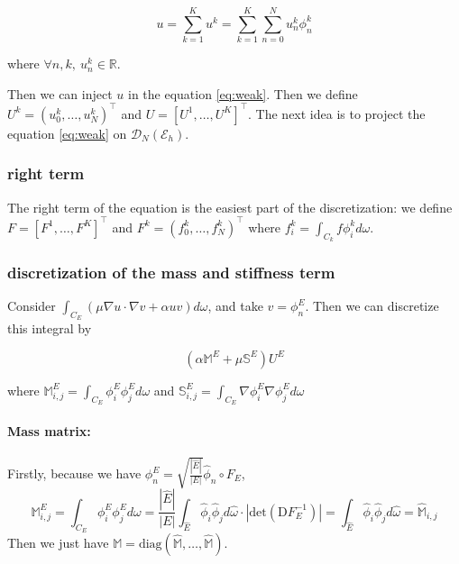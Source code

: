 \documentclass[a4paper,10pt]{article}
\begin{document}
$$
u = \sum_{k=1}^K u^k = \sum_{k=1}^K \sum_{n=0}^N u_n^k \phi_n^k
$$

where $\forall n,k,\ u_n^k \in \mathbb{R}$.


Then we can inject $u$ in the equation \ref{eq:weak}. Then we define $U^k = 
(u_0^k, \dots , u_N^k)^\top$ and $U = [U^1, \dots , U^K]^\top$. The next idea is to project the 
equation \ref{eq:weak} on $\mathcal{D}_N(\mathcal{E}_h)$.

\subsubsection{right term}

The right term of the equation is the easiest part of the discretization: we define $F = [F^1, 
\dots , F^K]^\top$ and $F^k = 
(f_0^k, \dots , f_N^k)^\top$ where $f_i^k = \int_{C_k} f \phi_i^k d\omega$.



\subsubsection{discretization of the mass and stiffness term}

Consider $\int_{C_E} (\mu \nabla u  \cdot \nabla v + \alpha uv) d\omega$, and take $v = \phi_n^E$. 
Then 
we can discretize this integral by

\begin{equation}
 \left( \alpha \mathbb{M}^E + \mu \mathbb{S}^E  \right) U^E
\end{equation}

where $\mathbb{M}^E_{i,j} = \int_{C_E} \phi_i^E \phi_j^E d\omega$ and $\mathbb{S}_{i,j}^E =
\int_{C_E} \nabla \phi_i^E \nabla \phi_j^E d\omega$

\paragraph{Mass matrix:}
Firstly, because we have $\phi_n^E = \sqrt{\frac{|\hat E|}{|E|}} \hat \phi_n \circ F_E$,
\begin{equation*}
 \mathbb{M}^E_{i,j} = \int_{C_E} \phi_i^E \phi_j^E d\omega 
 = \frac{|\hat E|}{|E|} \int_{\hat E} \hat \phi_i \hat \phi_j d\hat \omega \cdot |\mathrm{det} 
(\mathrm{D} F_E^{-1})| 
= \int_{\hat E} \hat \phi_i \hat \phi_j d\hat \omega 
=\widehat{\mathbb{M}}_{i,j}
\end{equation*}
Then we just have $\mathbb{M} = \mathrm{diag} ( \widehat{\mathbb{M}}, \dots, \widehat{\mathbb{M}})$.
\end{document}
